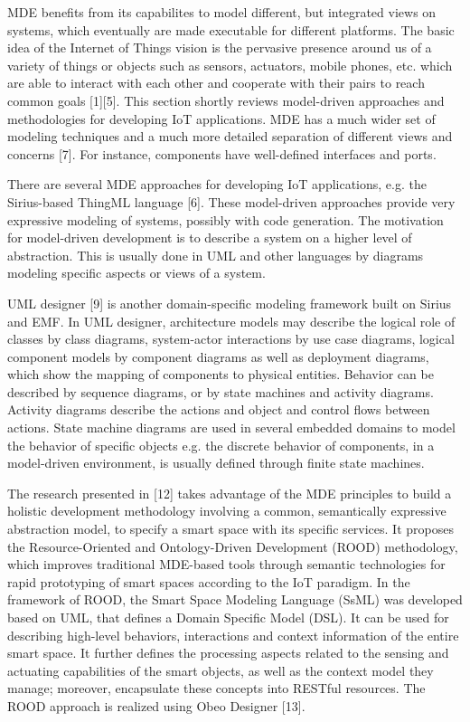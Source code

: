 MDE benefits from its capabilites to model different, but integrated views on systems, which eventually  are made executable for different platforms. The basic idea of the Internet of Things vision is the pervasive presence around us of a variety of things or objects such as sensors, actuators, mobile phones, etc. which are able to interact with each other and cooperate with their pairs to reach common goals [1][5]. This section shortly reviews model-driven approaches and methodologies for developing IoT applications. MDE has a much wider set of modeling techniques and a much more detailed separation of different views and concerns [7]. For instance, components have well-defined interfaces and ports.

There are several MDE approaches for developing IoT applications, e.g. the Sirius-based ThingML language [6]. These model-driven approaches provide very expressive modeling of systems, possibly with code generation. The motivation for model-driven development is to describe a system on a higher level of abstraction. This is usually done in UML and other languages by diagrams modeling specific aspects or views of a system.

UML designer [9] is another domain-specific modeling framework built on Sirius and EMF. In UML designer, architecture models may describe the logical role of classes by class diagrams, system-actor interactions by use case diagrams, logical component models by component diagrams as well as deployment diagrams, which show the mapping of components to physical entities. Behavior can be described by sequence diagrams, or by state machines and activity diagrams. Activity diagrams describe the actions and object and control flows between actions. State machine diagrams are used in several embedded domains to model the behavior of specific objects e.g. the discrete behavior of components, in a model-driven environment, is usually defined through finite state machines. 

The research presented in [12] takes advantage of the MDE principles to build a holistic development methodology involving a common, semantically expressive abstraction model, to specify a smart space with its specific services. It proposes the Resource-Oriented and Ontology-Driven Development (ROOD) methodology, which improves traditional MDE-based tools through semantic technologies for rapid prototyping of smart spaces according to the IoT paradigm. In the framework of ROOD, the Smart Space Modeling Language (SsML) was developed based on UML, that defines a Domain Specific Model (DSL). It can be used for describing high-level behaviors, interactions and context information of the entire smart space. It further defines the processing aspects related to the sensing and actuating capabilities of the smart objects, as well as the context model they manage; moreover, encapsulate these concepts into RESTful resources. The ROOD approach is realized using Obeo Designer [13].